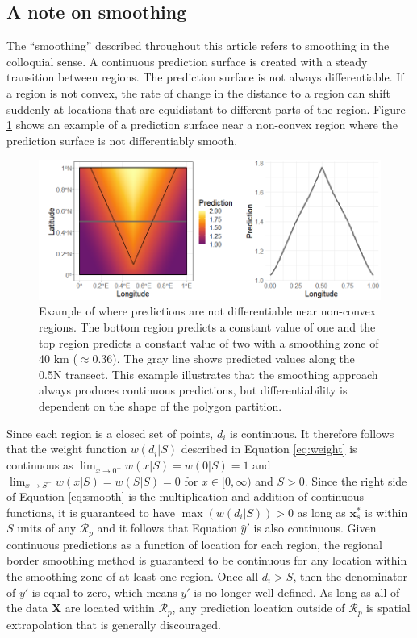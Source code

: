 \subsection{A note on smoothing}

The ``smoothing'' described throughout this article refers to smoothing in the colloquial sense. A continuous prediction surface is created with a steady transition between regions. The prediction surface is not always differentiable. If a region is not convex, the rate of change in the distance to a region can shift suddenly at locations that are equidistant to different parts of the region. Figure \ref{fig:nondiff} shows an example of a prediction surface near a non-convex region where the prediction surface is not differentiably smooth.

\begin{figure}[htbp]
    \centering
    \includegraphics[width = \textwidth]{figures/nondiff.png}
    \caption{Example of where predictions are not differentiable near non-convex regions. The bottom region predicts a constant value of one and the top region predicts a constant value of two with a smoothing zone of 40 km ($\approx 0.36$\textdegree). The gray line shows predicted values along the 0.5\textdegree N transect. This example illustrates that the smoothing approach always produces continuous predictions, but differentiability is dependent on the shape of the polygon partition. }
    \label{fig:nondiff}
\end{figure}

Since each region is a closed set of points, $d_i$ is continuous. It therefore follows that the weight function $w(d_i|S)$ described in  Equation \ref{eq:weight} is continuous as $\lim_{x\to0^{+}} w(x|S) = w(0|S) = 1$ and $\lim_{x\to S^{-}} w(x|S) = w(S|S) = 0$ for $x \in [0, \infty)$ and $S > 0$. Since the right side of Equation \ref{eq:smooth} is the multiplication and addition of continuous functions, it is guaranteed to have $\max\left(w(d_i|S)\right) > 0$ as long as $\pmb{x}^*_s$ is within $S$ units of any $\mathcal{R}_p$ and it follows that Equation $\hat{y}'$ is also continuous. Given continuous predictions as a function of location for each region, the regional border smoothing method is guaranteed to be continuous for any location within the smoothing zone of at least one region. Once all $d_i > S$, then the denominator of $y'$ is equal to zero, which means $y'$ is no longer well-defined. As long as all of the data $\pmb{X}$ are located within $\mathcal{R}_p$, any prediction location outside of $\mathcal{R}_p$ is spatial extrapolation that is generally discouraged.


